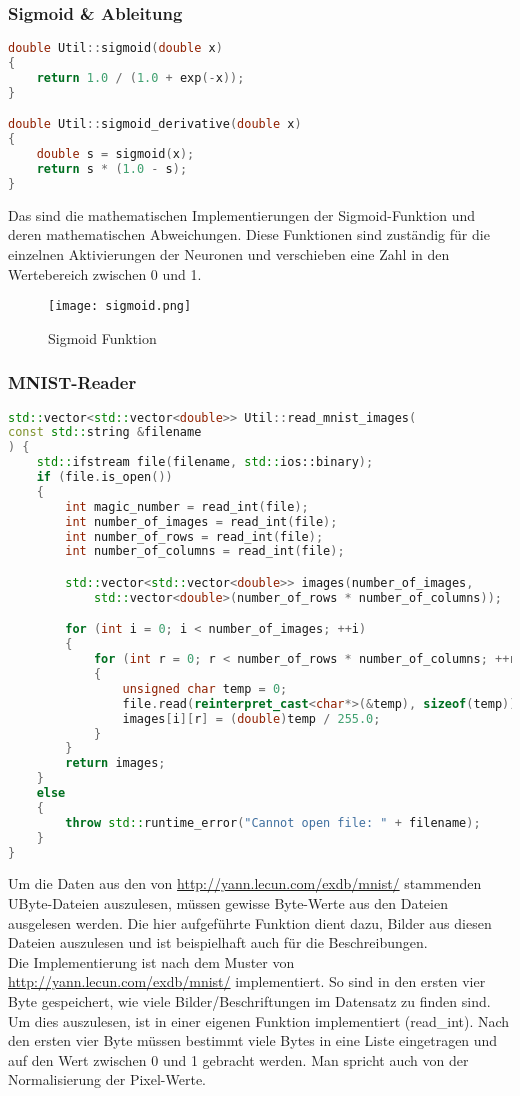 \subsubsection{Sigmoid \& Ableitung}
\label{sec:RealSigmoidAbleitungCode}
\begin{lstlisting}[language=c++]
double Util::sigmoid(double x) 
{
	return 1.0 / (1.0 + exp(-x));
}

double Util::sigmoid_derivative(double x)
{
	double s = sigmoid(x);
	return s * (1.0 - s);
}
\end{lstlisting}
Das sind die mathematischen Implementierungen der Sigmoid-Funktion und deren mathematischen Abweichungen. Diese Funktionen sind zuständig für die einzelnen Aktivierungen der Neuronen und verschieben eine Zahl in den Wertebereich zwischen 0 und 1.
\begin{figure}[H]
	\centering
		\texttt{[image: sigmoid.png]}
		\caption{Sigmoid Funktion}
	\label{fig:sigmoid}
\end{figure}

\subsubsection{MNIST-Reader}
\label{sec:RealMNISTReaderCode}
\begin{lstlisting}[language=c++]
std::vector<std::vector<double>> Util::read_mnist_images(
const std::string &filename
) {
	std::ifstream file(filename, std::ios::binary);
	if (file.is_open()) 
	{
		int magic_number = read_int(file);
		int number_of_images = read_int(file);
		int number_of_rows = read_int(file);
		int number_of_columns = read_int(file);

		std::vector<std::vector<double>> images(number_of_images, 
			std::vector<double>(number_of_rows * number_of_columns));

		for (int i = 0; i < number_of_images; ++i) 
		{
			for (int r = 0; r < number_of_rows * number_of_columns; ++r) 
			{
				unsigned char temp = 0;
				file.read(reinterpret_cast<char*>(&temp), sizeof(temp));
				images[i][r] = (double)temp / 255.0;
			}
		}
		return images;
	} 
	else 
	{
		throw std::runtime_error("Cannot open file: " + filename);
	}
}
\end{lstlisting}
Um die Daten aus den von \url{http://yann.lecun.com/exdb/mnist/} stammenden UByte-Dateien auszulesen, müssen gewisse Byte-Werte aus den Dateien ausgelesen werden. Die hier aufgeführte Funktion dient dazu, Bilder aus diesen Dateien auszulesen und ist beispielhaft auch für die Beschreibungen.
\\
Die Implementierung ist nach dem Muster von \url{http://yann.lecun.com/exdb/mnist/} implementiert. So sind in den ersten vier Byte gespeichert, wie viele Bilder/Beschriftungen im Datensatz zu finden sind. Um dies auszulesen, ist in einer eigenen Funktion implementiert (read\_int). Nach den ersten vier Byte müssen bestimmt viele Bytes in eine Liste eingetragen und auf den Wert zwischen 0 und 1 gebracht werden. Man spricht auch von der Normalisierung der Pixel-Werte.

